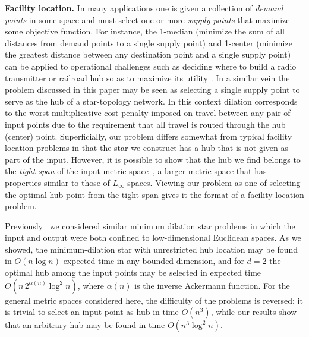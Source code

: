 \documentclass{llncs}
\begin{document}
\smallskip\noindent
{\bf Facility location.} In many applications one is given a collection of \emph{demand points} in some space and must select one or more \emph{supply points} that maximize some objective function. For instance, the 1-median (minimize the sum of all distances from demand points to a single supply point) and 1-center (minimize the greatest distance between any destination point and a single supply point) can be applied to operational challenges such as deciding where to build a radio transmitter or railroad hub so as to maximize its utility \cite{drezner_2002}.  In a similar vein the problem discussed in this paper may be seen as selecting a single supply point to serve as the hub of a star-topology network.  In this context dilation corresponds to the worst multiplicative cost penalty imposed on travel between any pair of input points due to the requirement that all travel is routed through the hub (center) point.  Superficially, our problem differs somewhat from typical facility location problems in that the star we construct has a hub that is not given as part of the input. However, it is possible to show that the hub we find belongs to the \emph{tight span} of the input metric space~\cite{DreHubMou-DM-01}, a larger metric space that has properties similar to those of $L_\infty$ spaces. Viewing our problem as one of selecting the optimal hub point from the tight span gives it the format of a facility location problem.

Previously~\cite{Eppstein200727} we considered similar minimum dilation star problems in which the input and output were both confined to low-dimensional Euclidean spaces. As we showed, the minimum-dilation star with unrestricted hub location may be found in $O(n\log n)$ expected time in any bounded dimension, and for $d=2$ the optimal hub among the input points may be selected in expected time $O(n \, 2^{\alpha(n)} \log^2 n)$, where $\alpha(n)$ is the inverse Ackermann function. For the general metric spaces considered here, the difficulty of the problems is reversed: it is trivial to select an input point as hub in time $O(n^3)$, while our results show that an arbitrary hub may be found in time $O(n^3 \log^2 n)$.
\end{document}
